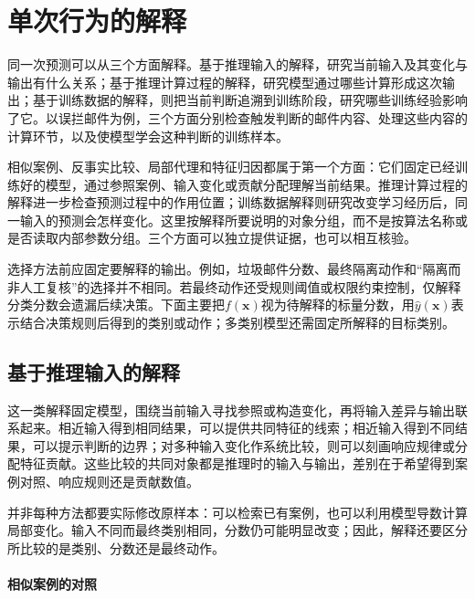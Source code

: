 \section{单次行为的解释}
\label{sec:interpretability-local}

同一次预测可以从三个方面解释。基于推理输入的解释，研究当前输入及其变化与输出有什么关系；基于推理计算过程的解释，研究模型通过哪些计算形成这次输出；基于训练数据的解释，则把当前判断追溯到训练阶段，研究哪些训练经验影响了它。以误拦邮件为例，三个方面分别检查触发判断的邮件内容、处理这些内容的计算环节，以及使模型学会这种判断的训练样本。

相似案例、反事实比较、局部代理和特征归因都属于第一个方面：它们固定已经训练好的模型，通过参照案例、输入变化或贡献分配理解当前结果。推理计算过程的解释进一步检查预测过程中的作用位置；训练数据解释则研究改变学习经历后，同一输入的预测会怎样变化。这里按解释所要说明的对象分组，而不是按算法名称或是否读取内部参数分组。三个方面可以独立提供证据，也可以相互核验。

选择方法前应固定要解释的输出。例如，垃圾邮件分数、最终隔离动作和“隔离而非人工复核”的选择并不相同。若最终动作还受规则阈值或权限约束控制，仅解释分类分数会遗漏后续决策。下面主要把$f(\bm{x})$视为待解释的标量分数，用$\hat y(\bm{x})$表示结合决策规则后得到的类别或动作；多类别模型还需固定所解释的目标类别。

\subsection{基于推理输入的解释}
\label{sec:interpretability-local-input}
\label{sec:interpretability-local-examples}
\label{sec:interpretability-local-counterfactual}
\label{sec:interpretability-local-neighborhood}
\label{sec:interpretability-local-attribution}

这一类解释固定模型，围绕当前输入寻找参照或构造变化，再将输入差异与输出联系起来。相近输入得到相同结果，可以提供共同特征的线索；相近输入得到不同结果，可以提示判断的边界；对多种输入变化作系统比较，则可以刻画响应规律或分配特征贡献。这些比较的共同对象都是推理时的输入与输出，差别在于希望得到案例对照、响应规则还是贡献数值。

并非每种方法都要实际修改原样本：可以检索已有案例，也可以利用模型导数计算局部变化。输入不同而最终类别相同，分数仍可能明显改变；因此，解释还要区分所比较的是类别、分数还是最终动作。

\paragraph{相似案例的对照}

